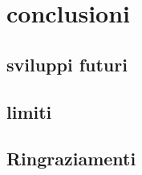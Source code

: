 \section{conclusioni}

\subsection{sviluppi futuri}

\subsection{limiti}

\subsection{Ringraziamenti}